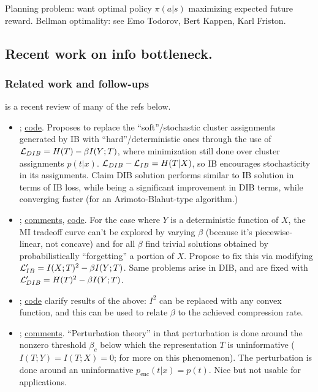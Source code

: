 \documentclass[notitlepage,openany,11pt]{report}
\theoremstyle{plain}%
\numberwithin{equation}{section}
\begin{document}
Planning problem: want optimal policy $\pi(a|s)$ maximizing expected future reward. Bellman optimality: see Emo Todorov, Bert Kappen, Karl Friston. 


\subsection{Recent work on info bottleneck.}


\subsubsection{Related work and follow-ups}

\cite{GoldfeldPolyanskiy:20} is a recent review of many of the refs below.

\begin{itemize}
\item \cite{StrouseSchwab:17}; \href{https://github.com/djstrouse/information-bottleneck}{code}. Proposes to replace the ``soft''/stochastic cluster assignments generated by IB with ``hard''/deterministic ones through the use of $\mathcal{L}_{DIB} = H(T) - \beta I(Y;T)$, where minimization still done over cluster assignments $p(t|x)$. $\mathcal{L}_{DIB} - \mathcal{L}_{IB} = H(T|X)$, so IB encourages stochasticity in its assignments. Claim DIB solution performs similar to IB solution in terms of IB loss, while being a significant improvement in DIB terms, while converging faster (for an Arimoto-Blahut-type algorithm.)

\item \cite{KolchinskyEtAl:18}; \href{https://openreview.net/forum?id=rke4HiAcY7}{comments}, \href{https://github.com/artemyk/ibcurve}{code}. For the case where $Y$ is a deterministic function of $X$, the MI tradeoff curve can't be explored by varying $\beta$ (because it's piecewise-linear, not concave) and for all $\beta$ find trivial solutions obtained by probabilistically ``forgetting'' a portion of $X$. Propose to fix this via modifying $\mathcal{L}'_{IB} = I(X;T)^2 - \beta I(Y;T)$. Same problems arise in DIB, and are fixed with $\mathcal{L}'_{DIB} = H(T)^2 - \beta I(Y;T)$.

\item \cite{RodriguezGalvezEtAl:20}; \href{https://github.com/burklight/convex-IB-Lagrangian-PyTorch}{code} clarify results of the above: $I^{2}$ can be replaced with any convex function, and this can be used to relate $\beta$ to the achieved compression rate.

\item \cite{NgampruetikornSchwab:21}; \href{https://openreview.net/forum?id=A2HvBPoSBMs}{comments}. ``Perturbation theory'' in that perturbation is done around the nonzero threshold $\beta_{c}$ below which the representation $T$ is uninformative ($I(T;Y) = I(T;X) =0$; \cite{WuEtAl:19} for more on this phenomenon). The perturbation is done around an uninformative $p_{\text{enc}}(t|x) = p(t)$. Nice but not usable for applications.


\end{itemize}
\end{document}
